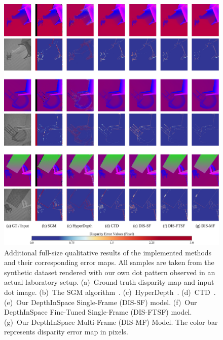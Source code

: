 \begin{figure}
    \begin{center}
        \includegraphics[width=1\linewidth]{images/chapter2/supp_figures/supp_results_3.jpg}
    \end{center}
   \caption{Additional full-size qualitative results of the implemented methods and their corresponding error maps. All samples are taken from the synthetic dataset rendered with our own dot pattern observed in an actual laboratory setup. (a)~Ground truth disparity map and input dot image. (b)~The SGM algorithm~\citep{hirschmuller2007stereo}. (c)~HyperDepth~\citep{ryan2016hyperdepth}. (d)~CTD~\citep{riegler2019connecting}. (e)~Our DepthInSpace Single-Frame (DIS-SF) model. (f)~Our DepthInSpace Fine-Tuned Single-Frame (DIS-FTSF) model. (g)~Our DepthInSpace Multi-Frame (DIS-MF) Model. The color bar represents disparity error map in pixels.}
    \label{fig:c2_actual_results}
\end{figure}

